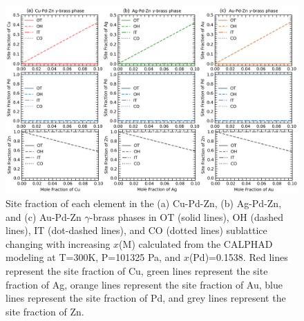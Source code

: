 \begin{figure}[H]
    \centering
    \includegraphics[width=1\linewidth]{intermetallics/Intermetallics-PdZnM-SiteFractionCalphad.png}
    \caption{Site fraction of each element in the (a) Cu-Pd-Zn, (b) Ag-Pd-Zn, and (c) Au-Pd-Zn $\gamma$-brass phases in OT (solid lines), OH (dashed lines), IT (dot-dashed lines), and CO (dotted lines) sublattice changing with increasing $x$(M) calculated from the CALPHAD modeling at T=300K, P=101325 Pa, and $x$(Pd)=0.1538. Red lines represent the site fraction of Cu, green lines represent the site fraction of Ag, orange lines represent the site fraction of Au, blue lines represent the site fraction of Pd, and grey lines represent the site fraction of Zn.}
    \label{intermetallics:fig:PdZnM-SiteFractionCalphad}
\end{figure}

